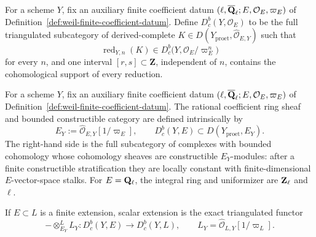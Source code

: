 
\begin{definition}
\label{def:weil-derived-complete-integral}


For a scheme \(Y\), fix an auxiliary finite coefficient datum
\((\ell,\overline{\mathbf Q}_\ell;E,\mathcal O_E,\varpi_E)\) of
Definition~\ref{def:weil-finite-coefficient-datum}.
Define \(D^b_c(Y,\mathcal O_E)\) to be the full
triangulated subcategory of derived-complete
\(K\in D(Y_{\mathrm{proet}},\widehat{\mathcal O}_{E,Y})\) such that
\[
 \operatorname{red}_{Y,n}(K)
 \in D^b_c\bigl(Y,\mathcal O_E/\varpi_E^n\bigr)
\]
for every \(n\), and one interval \([r,s]\subset\mathbf Z\), independent of
\(n\), contains the cohomological support of every reduction.
\end{definition}


\begin{definition}
\label{def:weil-rational-coefficients}


For a scheme \(Y\), fix an auxiliary finite coefficient datum
\((\ell,\overline{\mathbf Q}_\ell;E,\mathcal O_E,\varpi_E)\) of
Definition~\ref{def:weil-finite-coefficient-datum}.
The rational coefficient ring sheaf and bounded constructible category are
defined intrinsically by
\[
 E_Y:=\widehat{\mathcal O}_{E,Y}[1/\varpi_E],
 \qquad
 D^b_c(Y,E)\subset D(Y_{\mathrm{proet}},E_Y).
\]
The right-hand side is the full subcategory of complexes with bounded
cohomology whose cohomology sheaves are constructible \(E_Y\)-modules:
after a finite constructible stratification they are locally constant with
finite-dimensional \(E\)-vector-space stalks.  For \(E=\mathbf Q_{\ell}\), the integral
ring and uniformizer are \(\mathbf Z_\ell\) and \(\ell\).

If \(E\subset L\) is a finite extension, scalar extension is the exact
triangulated functor
\[
 -\otimes^L_{E_Y}L_Y:D^b_c(Y,E)\longrightarrow D^b_c(Y,L),
 \qquad L_Y=\widehat{\mathcal O}_{L,Y}[1/\varpi_L].
\]
\end{definition}

